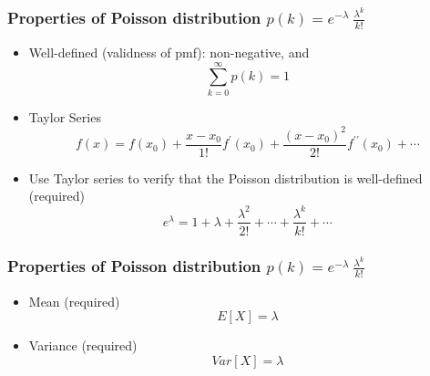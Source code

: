 \documentclass[slidestop,compress,mathserif]{beamer}
\begin{document}
%
%
%
%
%
%
\begin{frame}\frametitle{Properties of Poisson distribution $p(k) = e^{-\lambda}\ \frac{\lambda^k}{k!}$}

\begin{itemize}
\item Well-defined (validness of pmf): non-negative, and
\[\sum_{k = 0}^{\infty} p(k) = 1\]
\end{itemize}

\vfill
\begin{itemize}
\item Taylor Series
\[ f(x) = f(x_0) + \frac{x-x_0}{1!}f^{\prime}(x_0) + \frac{(x-x_0)^2}{2!} f^{\prime\prime}(x_0) + \cdots \]

\item Use Taylor series to verify that the Poisson distribution is well-defined  ({\color{red}required})
\[ e^{\lambda} = 1 + \lambda + \frac{\lambda^2}{2!} + \cdots + \frac{\lambda^k}{k!}+\cdots\]
\end{itemize}



\end{frame}
\begin{frame}\frametitle{Properties of Poisson distribution $p(k) = e^{-\lambda}\ \frac{\lambda^k}{k!}$}

\begin{itemize}
\item Mean ({\color{red}required})
\[E[X] = \lambda \]

\vspace{15mm}

\item Variance ({\color{red}required})
\[Var[X] = \lambda \]

\end{itemize}

\end{frame}
\end{document}

